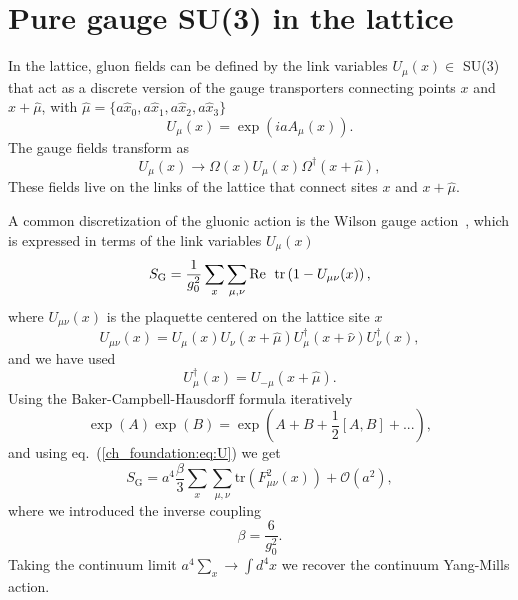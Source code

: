 
\section{Pure gauge SU(3) in the lattice}
\label{ch_foundation:sec:Gauge}

In the lattice, gluon fields can be defined by the link variables $U_{\mu}(x)\in$ SU(3) that act as a discrete version of the gauge transporters connecting points $x$ and $x+\hat{\mu}$, with $\hat{\mu}=\{a\hat{x}_0,a\hat{x}_1,a\hat{x}_2,a\hat{x}_3\}$
\begin{equation}
\label{ch_foundation:eq:U}
U_{\mu}(x)=\exp\left(iaA_{\mu}(x)\right).
\end{equation}
The gauge fields transform as 
\begin{equation}
\label{ch_foundation:eq:U_transf}
U_{\mu}(x)\to\Omega(x)U_{\mu}(x)\Omega^{\dagger}(x+\hat{\mu}),
\end{equation}
These fields live on the links of the lattice that connect sites $x$ and $x+\hat{\mu}$.

A common discretization of the gluonic action is the Wilson gauge action~\cite{Wilson:1974sk}, which is expressed in terms of the link variables $U_{\mu}(x)$
\begin{equation}
S_{\textrm{G}}=\frac{1}{g_0^2}\sum_x\sum_{\mu,\nu}{\textrm{Re\; tr}}\left(1-U_{\mu\nu}(x)\right),
\end{equation} 
where $U_{\mu\nu}(x)$ is the plaquette centered on the lattice site $x$
\begin{equation}
\label{ch_foundation:eq:plaq}
U_{\mu\nu}(x)=U_{\mu}(x)U_{\nu}(x+\hat{\mu})U_{\mu}^{\dagger}(x+\hat{\nu})U_{\nu}^{\dagger}(x),
\end{equation}
and we have used 
\begin{equation}
U_{\mu}^{\dagger}(x)=U_{-\mu}(x+\hat{\mu}).
\end{equation}
Using the Baker-Campbell-Hausdorff formula iteratively
\begin{equation}
\exp\left(A\right)\exp\left(B\right)=\exp\left(A+B+\frac{1}{2}\left[A,B\right]+...\right),
\end{equation}
and using eq.~(\ref{ch_foundation:eq:U}) we get
\begin{equation}
\label{ch_foundation:eq:YM-latt}
S_{\textrm{G}}=a^4\frac{\beta}{3}\sum_x\sum_{\mu,\nu}{\textrm{tr}}\left(F_{\mu\nu}^2(x)\right)+\mathcal{O}(a^2),
\end{equation}
where we introduced the inverse coupling
\begin{equation}
\beta=\frac{6}{g_0^2}.
\end{equation}
Taking the continuum limit $a^4\sum_x\rightarrow\int d^4x$ we recover the continuum Yang-Mills action.

